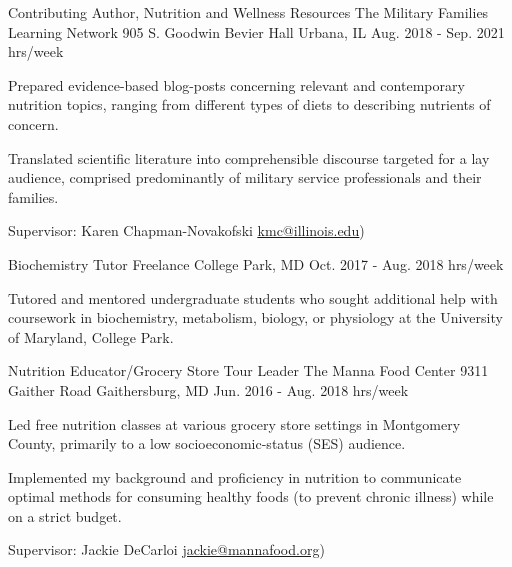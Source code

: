 \begin{cventries}
  \cventry
    {Contributing Author, Nutrition and Wellness Resources } %
    {The Military Families Learning Network } %
    {905 S. Goodwin  Bevier Hall \newline
    Urbana, IL} %
    {Aug. 2018 - Sep. 2021  hrs/week} %
    {
      \begin{cvitems} %
        \item {Prepared evidence-based blog-posts concerning relevant and contemporary nutrition topics, ranging from different types of diets to describing nutrients of concern.}
        \item {Translated scientific literature into comprehensible discourse targeted for a lay audience, comprised predominantly of military service professionals and their families.}
        \item {Supervisor: Karen Chapman-Novakofski \textcolor{navyblue}{\underline{\href{mailto:kmc@illinois.edu}{kmc@illinois.edu}}})}
      \end{cvitems}
    }

  \cventry
    {Biochemistry Tutor} %
    {Freelance} %
    {College Park, MD} %
    {Oct. 2017 - Aug. 2018  hrs/week} %
    {
      \begin{cvitems} %
        \item {Tutored and mentored undergraduate students who sought additional help with coursework in biochemistry, metabolism, biology, or physiology at the University of Maryland, College Park.}
      \end{cvitems}
    }


  \cventry
    {Nutrition Educator/Grocery Store Tour Leader } %
    {The Manna Food Center } %
    {9311 Gaither Road \newline
Gaithersburg, MD} %
    {Jun. 2016 - Aug. 2018  hrs/week} %
    {
      \begin{cvitems} %
        \item {Led free nutrition classes at various grocery store settings in Montgomery County, primarily to a low socioeconomic-status (SES) audience.}
        \item {Implemented my background and proficiency in nutrition to communicate optimal methods for consuming healthy foods (to prevent chronic illness) while on a strict budget.}
        \item {Supervisor: Jackie DeCarloi \textcolor{navyblue}{\underline{\href{mailto:jackie@mannafood.org}{jackie@mannafood.org}}})}
      \end{cvitems}
    }


\end{cventries}
